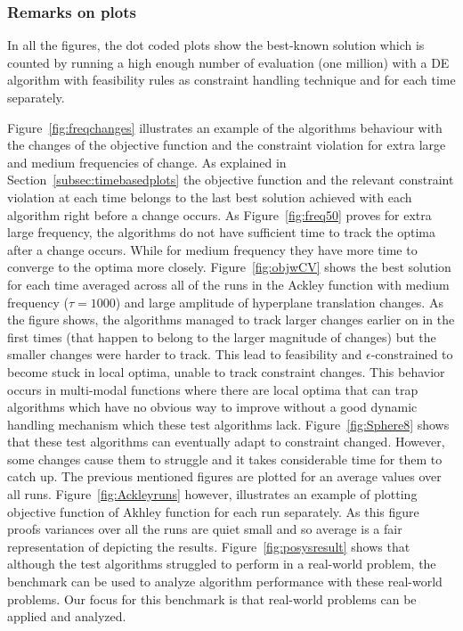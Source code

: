 \documentclass[review]{elsarticle}
\begin{document}
\subsubsection{Remarks on plots}
In all the figures, the dot coded plots show the best-known solution which is counted by running a high enough number of evaluation (one million) with a DE algorithm with feasibility rules as constraint handling technique and for each time separately. 

Figure~\ref{fig:freqchanges} illustrates an example of the algorithms behaviour with the changes of the objective function and the constraint violation for extra large and medium frequencies of change. As explained in Section~\ref{subsec:timebasedplots} the objective function and the relevant constraint violation at each time belongs to the last best solution achieved with each algorithm right before a change occurs. As Figure~\ref{fig:freq50} proves for extra large frequency, the algorithms do not have sufficient time to track the optima after a change occurs. While for medium frequency they have more time to converge to the optima more closely. Figure~\ref{fig:objwCV} shows the best solution for each time averaged across all of the runs in the Ackley function with medium frequency ($\tau=1000$) and large amplitude of hyperplane translation changes. As the figure shows, the algorithms managed to track larger changes earlier on in the first times (that happen to belong to the larger magnitude of changes) but the smaller changes were harder to track. This lead to feasibility and $\epsilon$-constrained to become stuck in local optima, unable to track constraint changes. This behavior occurs in multi-modal functions where there are local optima that can trap algorithms which have no obvious way to improve without a good dynamic handling mechanism which these test algorithms lack.
Figure~\ref{fig:Sphere8} shows that these test algorithms can eventually adapt to constraint changed. However, some changes cause them to struggle and it takes considerable time for them to catch up.
The previous mentioned figures are plotted for an average values over all runs. Figure~\ref{fig:Ackleyruns} however, illustrates an example of plotting objective function of Akhley function for each run separately. As this figure proofs variances over all the runs are quiet small and so average is a fair representation of depicting the results.
Figure~\ref{fig:posysresult} shows that although the test algorithms struggled to perform in a real-world problem, the benchmark can be used to analyze algorithm performance with these real-world problems. Our focus for this benchmark is that real-world problems can be applied and analyzed. 
\end{document}
